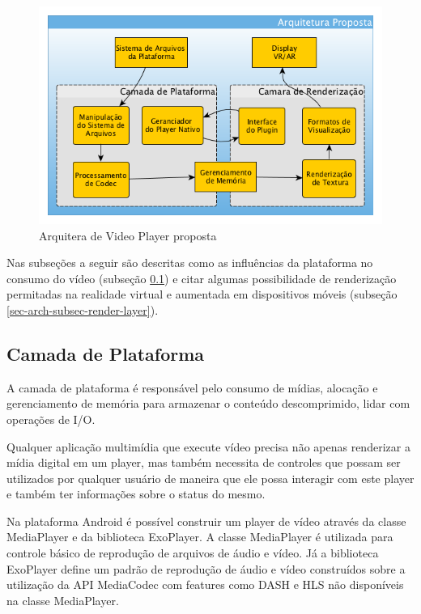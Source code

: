 \documentclass[sigconf]{acmart}
\begin{document}
\begin{figure}[h!]
    \centerline{\includegraphics[scale=0.7]{images/video_player_arch_pt}}
    \caption{Arquitera de Video Player proposta}
    \label{fig-video-player-arch}
\end{figure}

Nas subseções a seguir são descritas como as influências da plataforma no consumo do vídeo (subseção \ref{sec-arch-subsec-platform-layer}) e citar algumas possibilidade de renderização permitadas na realidade virtual e aumentada em dispositivos móveis (subseção \ref{sec-arch-subsec-render-layer}).

\subsection{Camada de Plataforma} \label{sec-arch-subsec-platform-layer}


A camada de plataforma é responsável pelo consumo de mídias, alocação e gerenciamento de memória para armazenar o conteúdo descomprimido, lidar com operações de I/O.

Qualquer aplicação multimídia que execute vídeo precisa não apenas renderizar a mídia digital em um player, mas também necessita de controles que possam ser utilizados por qualquer usuário de maneira que ele possa interagir com este player e também ter informações sobre o status do mesmo.

Na plataforma Android é possível construir um player de vídeo através da classe MediaPlayer e da biblioteca ExoPlayer. A classe MediaPlayer é utilizada para controle básico de reprodução de arquivos de áudio e vídeo. Já a biblioteca ExoPlayer define um padrão de reprodução de áudio e vídeo construídos sobre a utilização da API MediaCodec com features como DASH e HLS não disponíveis na classe MediaPlayer.
\end{document}
